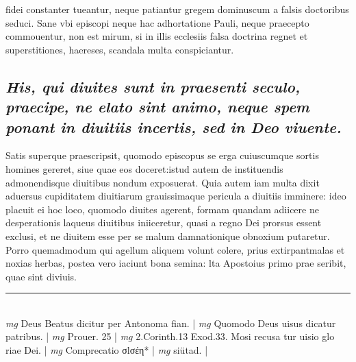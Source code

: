 \documentclass{article}
\begin{document}
\begin{pages}
fidei constanter tueantur, neque patiantur gregem dominuscum a falsis doctoribus seduci. Sane vbi episcopi neque hac adhortatione Pauli, neque praecepto commouentur, non est mirum, si in illis ecclesiis falsa doctrina regnet et superstitiones, haereses, scandala multa conspiciantur.  \pend
{}
{}
\subsection*{\textit{His, qui diuites sunt in praesenti seculo, praecipe, ne elato sint animo, neque spem ponant in diuitiis incertis, sed in Deo viuente. }}\pstart Satis superque praescripsit, quomodo episcopus se erga cuiuscumque sortis homines gereret, siue quae eos doceret:istud autem de instituendis admonendisque diuitibus nondum exposuerat. Quia autem iam multa dixit aduersus cupiditatem diuitiarum grauissimaque pericula a diuitiis imminere: ideo placuit ei hoc loco, quomodo diuites agerent, formam quandam adiicere ne desperationis laqueus diuitibus iniiceretur, quasi a regno Dei prorsus essent exclusi, et ne diuitem esse per se malum damnationique obnoxium putaretur. Porro quemadmodum qui agellum aliquem volunt colere, prius extirpantmalas et noxias herbas, postea vero iaciunt bona semina: lta Apostoius primo prae seribit, quae sint diviuis.  \pend
\vspace{0.5cm}\noindent
\vspace{0.2cm}\rule{1cm}{0.2pt}\\ 
\hspace{0.2cm}\textit{mg}
\footnotesize Deus Beatus dicitur per Antonoma fian. 
\normalsize| 
\hspace{0.2cm}\textit{mg}
\footnotesize Quomodo Deus uisus dicatur patribus. 
\normalsize| 
\hspace{0.2cm}\textit{mg}
\footnotesize Prouer. 25 
\normalsize| 
\hspace{0.2cm}\textit{mg}
\footnotesize 2.Corinth.13 Exod.33. Mosi recusa tur uisio glo riae Dei. 
\normalsize| 
\hspace{0.2cm}\textit{mg}
\footnotesize Comprecatio σlσέη* 
\normalsize| 
\hspace{0.2cm}\textit{mg}
\footnotesize siütad. 
\normalsize| 

\end{pages}
\end{document}
